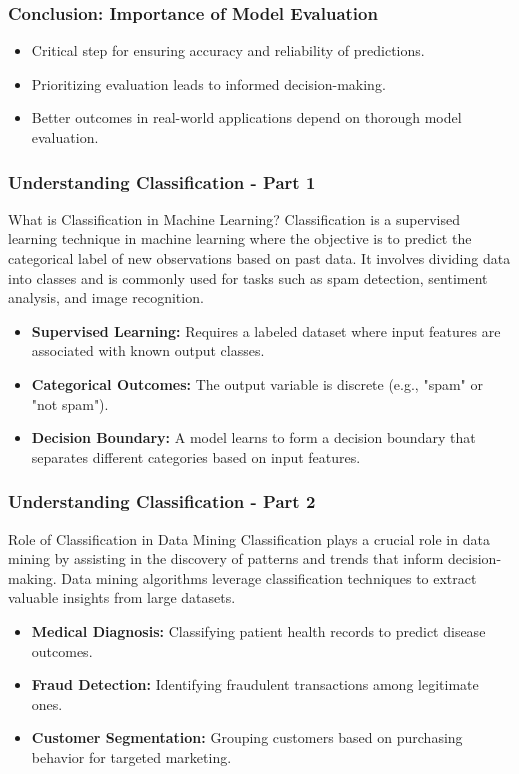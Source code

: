 \documentclass[aspectratio=169]{beamer}
\begin{document}
\begin{frame}[fragile]
    \frametitle{Conclusion: Importance of Model Evaluation}
    \begin{itemize}
        \item Critical step for ensuring accuracy and reliability of predictions.
        \item Prioritizing evaluation leads to informed decision-making.
        \item Better outcomes in real-world applications depend on thorough model evaluation.
    \end{itemize}
\end{frame}

\begin{frame}[fragile]
    \frametitle{Understanding Classification - Part 1}
    \begin{block}{What is Classification in Machine Learning?}
        Classification is a supervised learning technique in machine learning where the objective is to predict the categorical label of new observations based on past data. It involves dividing data into classes and is commonly used for tasks such as spam detection, sentiment analysis, and image recognition.
    \end{block}

    \begin{itemize}
        \item \textbf{Supervised Learning:} Requires a labeled dataset where input features are associated with known output classes.
        \item \textbf{Categorical Outcomes:} The output variable is discrete (e.g., "spam" or "not spam").
        \item \textbf{Decision Boundary:} A model learns to form a decision boundary that separates different categories based on input features.
    \end{itemize}
\end{frame}

\begin{frame}[fragile]
    \frametitle{Understanding Classification - Part 2}
    \begin{block}{Role of Classification in Data Mining}
        Classification plays a crucial role in data mining by assisting in the discovery of patterns and trends that inform decision-making. Data mining algorithms leverage classification techniques to extract valuable insights from large datasets.
    \end{block}

    \begin{itemize}
        \item \textbf{Medical Diagnosis:} Classifying patient health records to predict disease outcomes.
        \item \textbf{Fraud Detection:} Identifying fraudulent transactions among legitimate ones.
        \item \textbf{Customer Segmentation:} Grouping customers based on purchasing behavior for targeted marketing.
    \end{itemize}
\end{frame}
\end{document}
